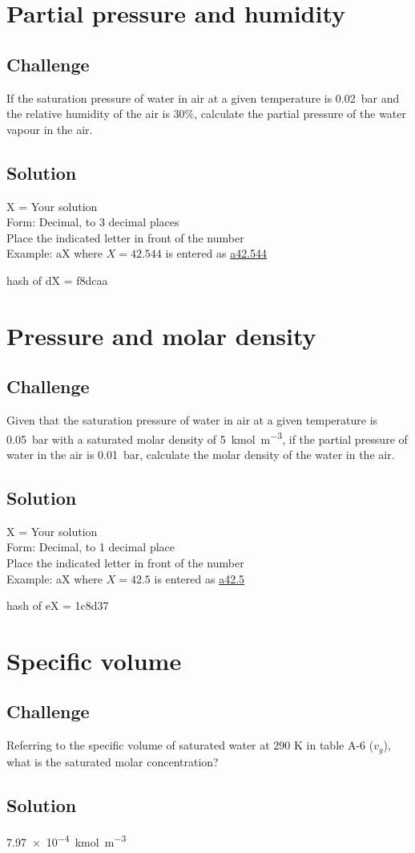 \newpage
\section{Partial pressure and humidity}

\subsection*{Challenge}
If the saturation pressure of water in air at a given temperature is \SI{0.02}{\bar} and the relative humidity of the air is 30\%, calculate the partial pressure of the water vapour in the air.

\subsection*{Solution}
X = Your solution\\
Form: Decimal, to 3 decimal places\\
Place the indicated letter in front of the number\\
Example: aX where $X=42.544$ is entered as \href{http://www.wolframalpha.com/input/?i=md5+hash+of+\%22a42.544\%22}{a42.544}

hash of dX = f8dcaa



\newpage
\section{Pressure and molar density}

\subsection*{Challenge}
Given that the saturation pressure of water in air at a given temperature is \SI{0.05}{\bar} with a saturated molar density of \SI{5}{\kmol\per\cubic\meter}, if the partial pressure of water in the air is \SI{0.01}{\bar}, calculate the molar density of the water in the air.

\subsection*{Solution}
X = Your solution\\
Form: Decimal, to 1 decimal place\\
Place the indicated letter in front of the number\\
Example: aX where $X=42.5$ is entered as \href{http://www.wolframalpha.com/input/?i=md5+hash+of+\%22a42.544\%22}{a42.5}

hash of eX = 1c8d37



\newpage
\section{Specific volume}

\subsection*{Challenge}
Referring to the specific volume of saturated water at 290 K in table A-6 ($v_g$), what is the saturated molar concentration?

\subsection*{Solution}
\SI{7.97e-4}{\kmol\per\cubic\meter}
